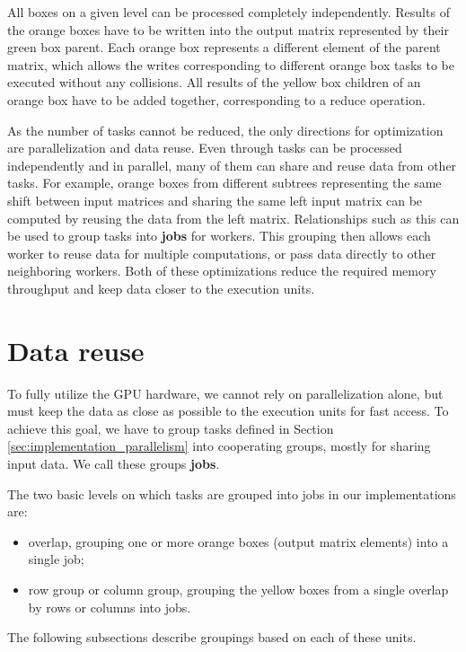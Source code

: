All boxes on a given level can be processed completely independently.  Results of the orange boxes have to be written into the output matrix represented by their green box parent. Each orange box represents a different element of the parent matrix, which allows the writes corresponding to different orange box tasks to be executed without any collisions. All results of the yellow box children of an orange box have to be added together, corresponding to a reduce operation.


As the number of tasks cannot be reduced, the only directions for optimization are parallelization and data reuse. Even through tasks can be processed independently and in parallel, many of them can share and reuse data from other tasks. For example, orange boxes from different subtrees representing the same shift between input matrices and sharing the same left input matrix can be computed by reusing the data from the left matrix. Relationships such as this can be used to group tasks into \textbf{jobs} for workers. This grouping then allows each worker to reuse data for multiple computations, or pass data directly to other neighboring workers. Both of these optimizations reduce the required memory throughput and keep data closer to the execution units. 

\section{Data reuse}
\label{sec:data_reuse}
To fully utilize the GPU hardware, we cannot rely on parallelization alone, but must keep the data as close as possible to the execution units for fast access. To achieve this goal, we have to group tasks defined in Section \ref{sec:implementation_parallelism} into cooperating groups, mostly for sharing input data. We call these groups \textbf{jobs}.


The two basic levels on which tasks are grouped into jobs in our implementations are:
\begin{itemize}
	\item overlap, grouping one or more orange boxes (output matrix elements) into a single job;
	\item row group or column group, grouping the yellow boxes from a single overlap by rows or columns into jobs.
\end{itemize}

The following subsections describe groupings based on each of these units.

